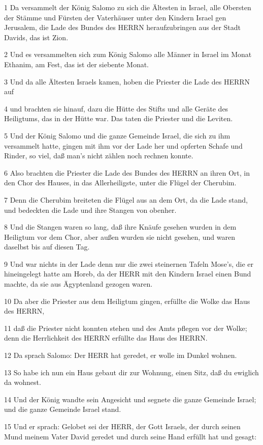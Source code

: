 \par 1 Da versammelt der König Salomo zu sich die Ältesten in Israel, alle Obersten der Stämme und Fürsten der Vaterhäuser unter den Kindern Israel gen Jerusalem, die Lade des Bundes des HERRN heraufzubringen aus der Stadt Davids, das ist Zion.
\par 2 Und es versammelten sich zum König Salomo alle Männer in Israel im Monat Ethanim, am Fest, das ist der siebente Monat.
\par 3 Und da alle Ältesten Israels kamen, hoben die Priester die Lade des HERRN auf
\par 4 und brachten sie hinauf, dazu die Hütte des Stifts und alle Geräte des Heiligtums, das in der Hütte war. Das taten die Priester und die Leviten.
\par 5 Und der König Salomo und die ganze Gemeinde Israel, die sich zu ihm versammelt hatte, gingen mit ihm vor der Lade her und opferten Schafe und Rinder, so viel, daß man's nicht zählen noch rechnen konnte.
\par 6 Also brachten die Priester die Lade des Bundes des HERRN an ihren Ort, in den Chor des Hauses, in das Allerheiligste, unter die Flügel der Cherubim.
\par 7 Denn die Cherubim breiteten die Flügel aus an dem Ort, da die Lade stand, und bedeckten die Lade und ihre Stangen von obenher.
\par 8 Und die Stangen waren so lang, daß ihre Knäufe gesehen wurden in dem Heiligtum vor dem Chor, aber außen wurden sie nicht gesehen, und waren daselbst bis auf diesen Tag.
\par 9 Und war nichts in der Lade denn nur die zwei steinernen Tafeln Mose's, die er hineingelegt hatte am Horeb, da der HERR mit den Kindern Israel einen Bund machte, da sie aus Ägyptenland gezogen waren.
\par 10 Da aber die Priester aus dem Heiligtum gingen, erfüllte die Wolke das Haus des HERRN,
\par 11 daß die Priester nicht konnten stehen und des Amts pflegen vor der Wolke; denn die Herrlichkeit des HERRN erfüllte das Haus des HERRN.
\par 12 Da sprach Salomo: Der HERR hat geredet, er wolle im Dunkel wohnen.
\par 13 So habe ich nun ein Haus gebaut dir zur Wohnung, einen Sitz, daß du ewiglich da wohnest.
\par 14 Und der König wandte sein Angesicht und segnete die ganze Gemeinde Israel; und die ganze Gemeinde Israel stand.
\par 15 Und er sprach: Gelobet sei der HERR, der Gott Israels, der durch seinen Mund meinem Vater David geredet und durch seine Hand erfüllt hat und gesagt:
